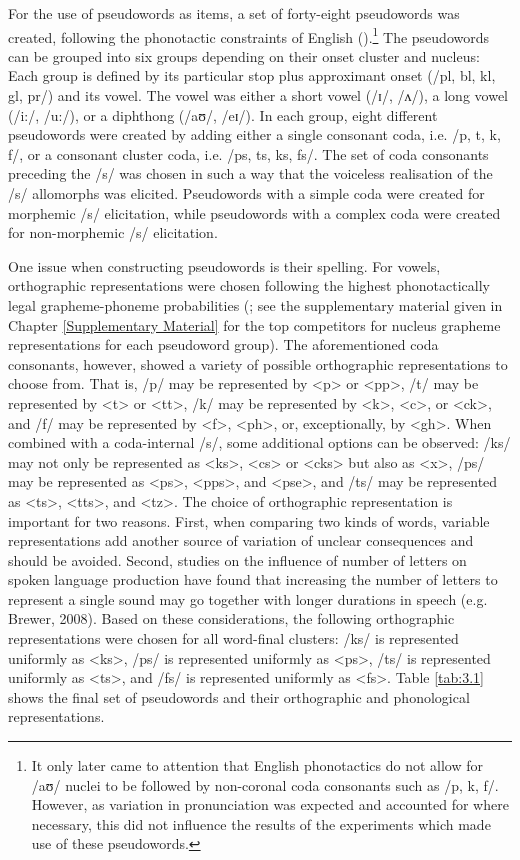 For the use of pseudowords as items, a set of forty-eight pseudowords was created, following the phonotactic constraints of English (\cite{Gontijo2003}).\footnote{It only later came to attention that English phonotactics do not allow for /aʊ/ nuclei to be followed by non-coronal coda consonants such as /p, k, f/. However, as variation in pronunciation was expected and accounted for where necessary, this did not influence the results of the experiments which made use of these pseudowords.} The pseudowords can be grouped into six groups depending on their onset cluster and nucleus: Each group is defined by its particular stop plus approximant onset (/pl, bl, kl, gl, pr/) and its vowel. The vowel was either a short vowel (/ɪ/, /ʌ/), a long vowel (/i:/, /u:/), or a diphthong (/aʊ/, /eɪ/). In each group, eight different pseudowords were created by adding either a single consonant coda, i.e. /p, t, k, f/, or a consonant cluster coda, i.e. /ps, ts, ks, fs/. The set of coda consonants preceding the /s/ was chosen in such a way that the voiceless realisation of the /s/ allomorphs was elicited. Pseudowords with a simple coda were created for morphemic /s/ elicitation, while pseudowords with a complex coda were created for non-morphemic /s/ elicitation.

One issue when constructing pseudowords is their spelling. For vowels, orthographic representations were chosen following the highest phonotactically legal grapheme-phoneme probabilities (\cite{Gontijo2003}; see the supplementary material given in Chapter \ref{Supplementary Material} for the top competitors for nucleus grapheme representations for each pseudoword group). The aforementioned coda consonants, however, showed a variety of possible orthographic representations to choose from. That is, /p/ may be represented by <p> or <pp>, /t/ may be represented by <t> or <tt>, /k/ may be represented by <k>, <c>, or <ck>, and /f/ may be represented by <f>, <ph>, or, exceptionally, by <gh>. When combined with a coda-internal /s/, some additional options can be observed: /ks/ may not only be represented as <ks>, <cs> or <cks> but also as <x>, /ps/ may be represented as <ps>, <pps>, and <pse>, and /ts/ may be represented as <ts>, <tts>, and <tz>. The choice of orthographic representation is important for two reasons. First, when comparing two kinds of words, variable representations add another source of variation of unclear consequences and should be avoided. Second, studies on the influence of number of letters on spoken language production have found that increasing the number of letters to represent a single sound may go together with longer durations in speech (e.g. Brewer, 2008). Based on these considerations, the following orthographic representations were chosen for all word-final clusters: /ks/ is represented uniformly as <ks>, /ps/ is represented uniformly as <ps>, /ts/ is represented uniformly as <ts>, and /fs/ is represented uniformly as <fs>. Table \ref{tab:3.1} shows the final set of pseudowords and their orthographic and phonological representations.

